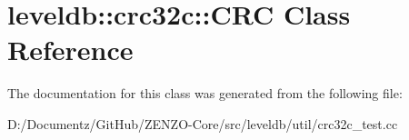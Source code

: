 \hypertarget{classleveldb_1_1crc32c_1_1_c_r_c}{}\section{leveldb\+::crc32c\+::C\+RC Class Reference}
\label{classleveldb_1_1crc32c_1_1_c_r_c}


The documentation for this class was generated from the following file\+:\begin{DoxyCompactItemize}
\item 
D\+:/\+Documentz/\+Git\+Hub/\+Z\+E\+N\+Z\+O-\/\+Core/src/leveldb/util/crc32c\+\_\+test.\+cc\end{DoxyCompactItemize}
